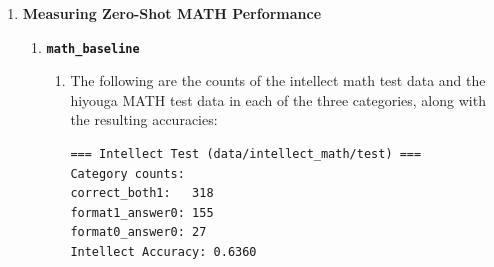 \documentclass{article}
\begin{document}
\begin{enumerate}[start=1,label=\arabic*.]
    \item[\textbf{3}] \textbf{Measuring Zero-Shot MATH Performance}
        \begin{enumerate}
            \item[\textbf{3.2}] \textbf{\texttt{math\_baseline}}
                \begin{enumerate}[label=(\alph*)]
                    \item The following are the counts of the intellect math test data and the hiyouga MATH test data in each of the three categories, along with the resulting accuracies: 
                    \begin{verbatim}
=== Intellect Test (data/intellect_math/test) ===
Category counts:
correct_both1:   318
format1_answer0: 155
format0_answer0: 27
Intellect Accuracy: 0.6360


\end{verbatim}
\end{enumerate}
\end{enumerate}
\end{enumerate}
\end{document}
